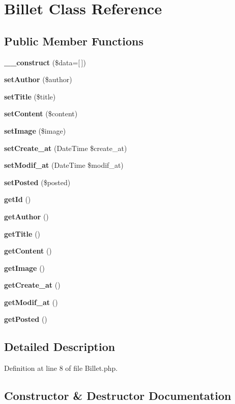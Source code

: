 \section{Billet Class Reference}
\label{class_src_1_1_entity_1_1_billet}
\subsection*{Public Member Functions}
\begin{DoxyCompactItemize}
\item 
\textbf{ \+\_\+\+\_\+construct} (\$data=[$\,$])
\item 
\textbf{ set\+Author} (\$author)
\item 
\textbf{ set\+Title} (\$title)
\item 
\textbf{ set\+Content} (\$content)
\item 
\textbf{ set\+Image} (\$image)
\item 
\textbf{ set\+Create\+\_\+at} (Date\+Time \$create\+\_\+at)
\item 
\textbf{ set\+Modif\+\_\+at} (Date\+Time \$modif\+\_\+at)
\item 
\textbf{ set\+Posted} (\$posted)
\item 
\textbf{ get\+Id} ()
\item 
\textbf{ get\+Author} ()
\item 
\textbf{ get\+Title} ()
\item 
\textbf{ get\+Content} ()
\item 
\textbf{ get\+Image} ()
\item 
\textbf{ get\+Create\+\_\+at} ()
\item 
\textbf{ get\+Modif\+\_\+at} ()
\item 
\textbf{ get\+Posted} ()
\end{DoxyCompactItemize}


\subsection{Detailed Description}


Definition at line 8 of file Billet.\+php.



\subsection{Constructor \& Destructor Documentation}
\mbox{\label{class_src_1_1_entity_1_1_billet_ab3129f1d71e9f51353de9d551ea381d7}} 

